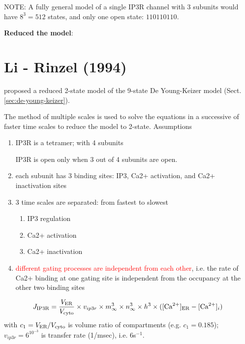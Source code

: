 NOTE: A fully general model of a single IP3R channel with 3 subunits would have
$8^3=512$ states, and only one open state: $110110110$.

{\bf Reduced the model}: 



\section{Li - Rinzel (1994)}
\label{sec:IP3R-Li-Rinzel-1994}

\citep{li1994} proposed a reduced 2-state model of the 9-state De Young-Keizer
model (Sect.\ref{sec:de-young-keizer}).

The method of multiple scales is used to solve the equations in a successive of
faster time scales to reduce the model to 2-state.
Assumptions
\begin{enumerate}
  \item IP3R is a tetramer; with 4 subunits

IP3R is open only when 3 out of 4 subunits are open.

  
  \item each subunit has 3 binding sites: IP3, Ca2+ activation, and Ca2+
  inactivation sites

  \item 3 time scales are separated: from fastest to slowest
  \begin{enumerate}
    \item IP3 regulation
    \item Ca2+ activation
    \item Ca2+ inactivation
  \end{enumerate}
  
  \item \textcolor{red}{different gating processes are independent from each
  other}, i.e.
  the rate of Ca2+ binding at one gating site is independent from the occupancy
  at the other two binding sites
\end{enumerate}




\begin{equation}
J_\text{IP3R} = \frac{V_{\text{ER}}}{V_{\text{cyto}}} \times v_{ip3r} \times m_\infty^3
\times n_\infty^3 \times h^3 \times ([{\text{Ca}^{2+}}]_{\text{ER}} - [{\text{Ca}^{2+}}]_i)
\end{equation}
with $c_1 = V_{\text{ER}}/V_{\text{cyto}}$ is volume ratio of compartments (e.g. 
$c_1=0.185$); $v_{ip3r}=6^10^{-3}$ is transfer rate (1/msec), i.e. 6s$^{-1}$.
 
